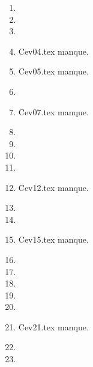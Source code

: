 \begin{enumerate}
  \item  
  \item  
  \item  
  \item Cev04.tex manque. 
  \item Cev05.tex manque. 
  \item  
  \item Cev07.tex manque. 
  \item  
  \item  
  \item  
  \item  
  \item Cev12.tex manque. 
  \item  
  \item  
  \item Cev15.tex manque. 
  \item  
  \item  
  \item  
  \item  
  \item  
  \item Cev21.tex manque. 
  \item  
  \item  
\end{enumerate} 
